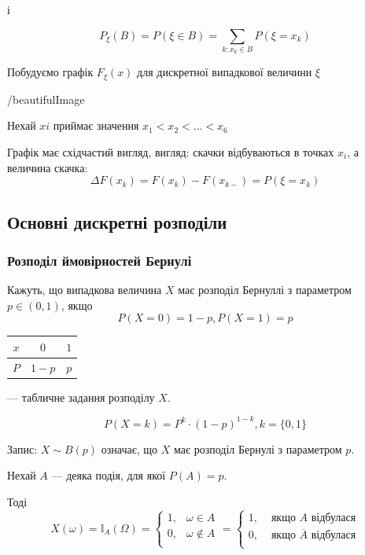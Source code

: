 і

$$P_{\xi}(B)
= P(\xi \in B)
= \sum\limits_{k: x_k \in B} P(\xi = x_k)$$

Побудуємо графік $F_{\xi}(x)$ для дискретної випадкової величини $\xi$

/beautifulImage

Нехай $xi$ приймає значення $x_1 < x_2 < ... < x_6$ 


Графік має східчастий вигляд, вигляд: скачки відбуваються в точках
$x_i$, а величина скачка:
$$\Delta F(x_k)
= F(x_k) - F(x_{k-})
= P(\xi = x_k)$$

\subsection{Основні дискретні розподіли}

\subsubsection{Розподіл ймовірностей Бернулі}

Кажуть, що випадкова величина $X$ має розподіл
Бернуллі з параметром $p \in (0, 1)$, якщо
$$P(X=0) = 1 - p, P(X = 1) = p$$

\begin{center}
    \begin{tabular}{c|c|c}
        $x$ & $0$ & $1$ \\
        \hline $P$ & $1-p$ & $p$ \\
    \end{tabular}
    --- табличне задання розподілу $X$.
\end{center}

$$P(X=k) = P^k \cdot (1-p)^{1-k}, k = \{0, 1\}$$

Запис: $X \sim B(p)$ означає, що $X$ має розподіл Бернулі з параметром $p$.

Нехай $A$ --- деяка подія, для якої $P(A) = p$.

Тоді 
$$X(\omega)
= \mathbb{I}_{A}(\Omega)
= \left\{ \begin{array}{ll}
    1, & \omega \in A \\
    0, & \omega \notin A \\
\end{array} \right.
= \left\{ \begin{array}{ll}
    1, & \text{ якщо } A \text{ відбулася} \\
    0, & \text{ якщо } \overline{A} \text{ відбулася} \\
\end{array} \right.$$

